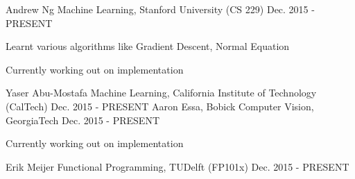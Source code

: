 \begin{cventries}
  \cventry
    {Andrew Ng}
    {Machine Learning, Stanford University (CS 229)}
    {}
    {Dec. 2015 - PRESENT}
    {
      \begin{cvitems}
        \item {Learnt various algorithms like Gradient Descent, Normal Equation}
        \item {Currently working out on implementation}
      \end{cvitems}
    }
\cventry
    {Yaser Abu-Mostafa}
    {Machine Learning, California Institute of Technology (CalTech)}
    {}
    {Dec. 2015 - PRESENT}
    {}
  \cventry
    {Aaron Essa, Bobick}
    {Computer Vision, GeorgiaTech}
    {}
    {Dec. 2015 - PRESENT}
    {
        \begin{cvitems}
        \item {Currently working out on implementation}
        \end{cvitems}
    }
    \cventry
    {Erik Meijer}
    {Functional Programming, TUDelft (FP101x)}
    {}
    {Dec. 2015 - PRESENT}
    {}
\end{cventries}
